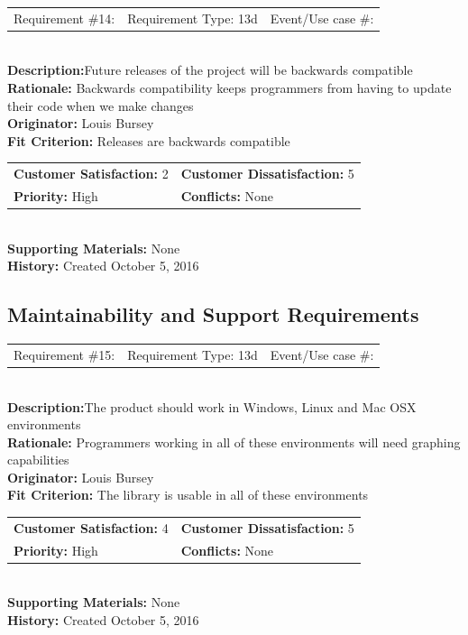 \documentclass[12pt, titlepage]{article}
\begin{document}
%
%
\begin{reqbox}
\begin{tabular}{ccc}
Requirement \#14: & Requirement Type: 13d & Event/Use case \#: \\
\end{tabular} \\
\textbf{Description:}Future releases of the project will be backwards compatible \\
\textbf{Rationale:} Backwards compatibility keeps programmers from having to update their code when we make changes\\
\textbf{Originator:} Louis Bursey\\
\textbf{Fit Criterion:}  Releases are backwards compatible\\
\begin{tabular}{ll}
\textbf{Customer Satisfaction:} 2 & \textbf{Customer Dissatisfaction:} 5 \\
\textbf{Priority:} High & \textbf{Conflicts:} None\\
\end{tabular} \\
\textbf{Supporting Materials:} None \\
\textbf{History:} Created October 5, 2016
\end{reqbox}

\subsection{Maintainability and Support Requirements}
%
%
%
%
%
\begin{reqbox}
\begin{tabular}{ccc}
Requirement \#15: & Requirement Type: 13d & Event/Use case \#: \\
\end{tabular} \\
\textbf{Description:}The product should work in Windows, Linux and Mac OSX environments \\
\textbf{Rationale:} Programmers working in all of these environments will need graphing capabilities\\
\textbf{Originator:} Louis Bursey\\
\textbf{Fit Criterion:}  The library is usable in all of these environments \\
\begin{tabular}{ll}
\textbf{Customer Satisfaction:} 4 & \textbf{Customer Dissatisfaction:} 5 \\
\textbf{Priority:} High & \textbf{Conflicts:} None\\
\end{tabular} \\
\textbf{Supporting Materials:} None \\
\textbf{History:} Created October 5, 2016
\end{reqbox}
\end{document}
